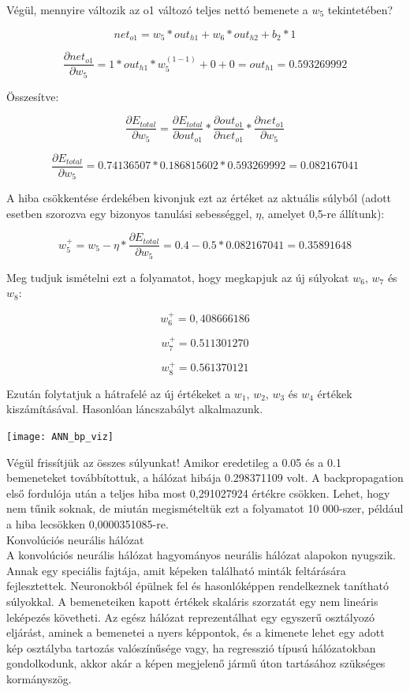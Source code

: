 Végül, mennyire változik az o1 változó teljes nettó bemenete a \(w_5\) tekintetében?

\[net_{o1} = w_5 * out_{h1} + w_6 * out_{h2} + b_2 * 1\]

\[\frac{\partial net_{o1}}{\partial w_{5}} = 1 * out_{h1} * w_5^{(1 - 1)} + 0 + 0 = out_{h1} = 0.593269992\]

Összesítve:

\[\frac{\partial E_{total}}{\partial w_{5}} = \frac{\partial E_{total}}{\partial out_{o1}} * \frac{\partial out_{o1}}{\partial net_{o1}} * \frac{\partial net_{o1}}{\partial w_{5}}\]

\[\frac{\partial E_{total}}{\partial w_{5}} = 0.74136507 * 0.186815602 * 0.593269992 = 0.082167041\]

A hiba csökkentése érdekében kivonjuk ezt az értéket az aktuális súlyból (adott esetben szorozva egy bizonyos tanulási sebességgel, $\eta$, amelyet 0,5-re állítunk):

\[w_5^{+} = w_5 - \eta * \frac{\partial E_{total}}{\partial w_{5}} = 0.4 - 0.5 * 0.082167041 = 0.35891648\]

Meg tudjuk ismételni ezt a folyamatot, hogy megkapjuk az új súlyokat $w_6$, $w_7$ és $w_8$:

\[w_6 ^ {+} = 0,408666186\]

\[w_7 ^ {+} = 0.511301270\]

\[w_8 ^ {+} = 0.561370121\]

Ezután folytatjuk a hátrafelé az új értékeket a $w_1$, $w_2$, $w_3$ és $w_4$ értékek kiszámításával. Hasonlóan láncszabályt alkalmazunk.

\begin{center}
\texttt{[image: ANN\_bp\_viz]}
\end{center}

Végül frissítjük az összes súlyunkat! Amikor eredetileg a 0.05 és a 0.1 bemeneteket továbbítottuk, a hálózat hibája 0.298371109 volt. A backpropagation első fordulója után a teljes hiba most 0,291027924 értékre csökken. Lehet, hogy nem tűnik soknak, de miután megismételtük ezt a folyamatot 10 000-szer, például a hiba lecsökken 0,0000351085-re.\\

{\Large Konvolúciós neurális hálózat}\\

A konvolúciós neurális hálózat hagyományos neurális hálózat alapokon nyugszik. Annak egy speciális fajtája, amit képeken található minták feltárására fejlesztettek. Neuronokból épülnek fel és hasonlóképpen rendelkeznek tanítható súlyokkal. A bemeneteiken kapott értékek skaláris szorzatát egy nem lineáris leképezés követheti. Az egész hálózat reprezentálhat egy egyszerű osztályozó eljárást, aminek a bemenetei a nyers képpontok, és a kimenete lehet egy adott kép osztályba tartozás valószínűsége vagy, ha regresszió típusú hálózatokban gondolkodunk, akkor akár a képen megjelenő jármű úton tartásához szükséges kormányszög.

